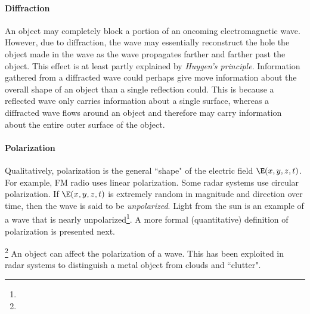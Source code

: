 \paragraph{Diffraction}
An object may completely block a portion of an oncoming electromagnetic wave.
However, due to diffraction, the wave may essentially reconstruct the
hole the object made in the wave as the wave propagates farther and farther past
the object.  This effect is at least partly explained by {\em Huygen's principle}.
Information gathered from a diffracted wave could perhaps give move
information about the overall shape of an object than a single reflection could.
This is because a reflected wave only carries information about a single surface,
whereas a diffracted wave flows around an object and therefore may carry information
about the entire outer surface of the object.

\paragraph{Polarization}
Qualitatively, polarization is the general ``shape" of the electric field $\E(x,y,z,t)$.
For example, FM radio uses linear polarization.
Some radar systems use circular polarization.
If $\E(x,y,z,t)$ is extremely random in magnitude and direction over time,
then the wave is said to be {\em unpolarized}.
Light from the sun is an example of a wave that is nearly unpolarized\footnote{}.
A more formal (quantitative) definition of polarization is presented next.

\begin{definition}
\label{def_polarizatioin}
\end{definition}

\begin{remark}
\footnote{}
An object can affect the polarization of a wave.
This has been exploited in radar systems to distinguish a metal object from
clouds and ``clutter".
\end{remark}

